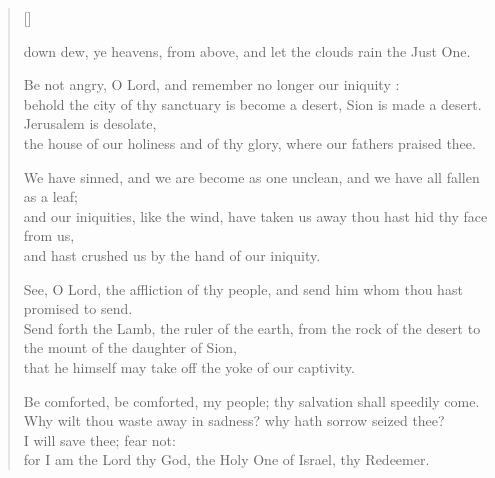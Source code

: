 \newHymn
\JustHymnNum
{}
\settowidth{\versewidth}{own dew, ye heavens, from above, and let
the}

\begin{verse}[\versewidth]

 down dew, ye heavens, from above, and let the clouds rain the Just One.

Be not angry, O Lord, and remember no longer our iniquity :\\
behold the city of thy sanctuary is become a desert, Sion is made a
desert. Jerusalem is desolate,\\
the house of our holiness and of thy glory, where our fathers praised thee.


We have sinned, and we are become as one unclean, and we have all
fallen as a leaf;\\
and our iniquities, like the wind, have
taken us away thou hast hid thy face from us,\\
and hast crushed us by the hand of our iniquity.

See, O Lord, the affliction of thy people, and send him whom thou hast
promised to send.\\
Send forth the Lamb, the ruler of the
earth, from the rock of the desert to the mount of the daughter of
Sion,\\
that he himself may take off the yoke of our
captivity.

Be comforted, be comforted, my people; thy salvation shall speedily
come.\\
Why wilt thou waste away in sadness? why hath sorrow
seized thee?\\
I will save thee; fear not:\\
for I am the Lord thy God, the Holy One of Israel, thy Redeemer.

\end{verse}


